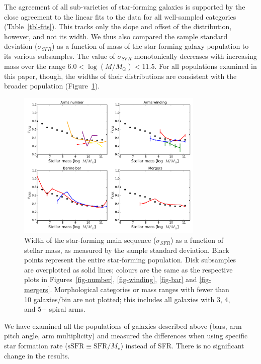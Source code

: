 \documentclass[useAMS,usenatbib]{mn2e}
\begin{document}
The agreement of all sub-varieties of star-forming galaxies is supported by the close agreement to the linear fits to the data for all well-sampled categories (Table~\ref{tbl-fits}). This tracks only the slope and offset of the distribution, however, and not its width. We thus also compared the sample standard deviation ($\sigma_{SFR}$) as a function of mass of the star-forming galaxy population to its various subsamples. The value of $\sigma_{SFR}$ monotonically decreases with increasing mass over the range $6.0<\log(M/M_\odot)<11.5$. For all populations examined in this paper, though, the widths of their distributions are consistent with the broader population (Figure~\ref{fig-sigma}). 

\begin{figure}
\includegraphics[angle=0,width=3.5in]{figures/sigma_mstar.pdf}
\caption{Width of the star-forming main sequence ($\sigma_{SFR}$) as a function of stellar mass, as measured by the sample standard deviation. Black points represent the entire star-forming population. Disk subsamples are overplotted as solid lines; colours are the same as the respective plots in Figures~\ref{fig-number}, \ref{fig-winding}, \ref{fig-bar} and \ref{fig-mergers}. Morphological categories or mass ranges with fewer than 10 galaxies/bin are not plotted; this includes all galaxies with 3, 4, and 5+ spiral arms.
\label{fig-sigma}}
\end{figure}

We have examined all the populations of galaxies described above (bars, arm pitch angle, arm multiplicity) and measured the differences when using specific star formation rate ($\textrm{sSFR}\equiv\textrm{SFR}/M_\star$) instead of SFR. There is no significant change in the results. 

\end{document}
